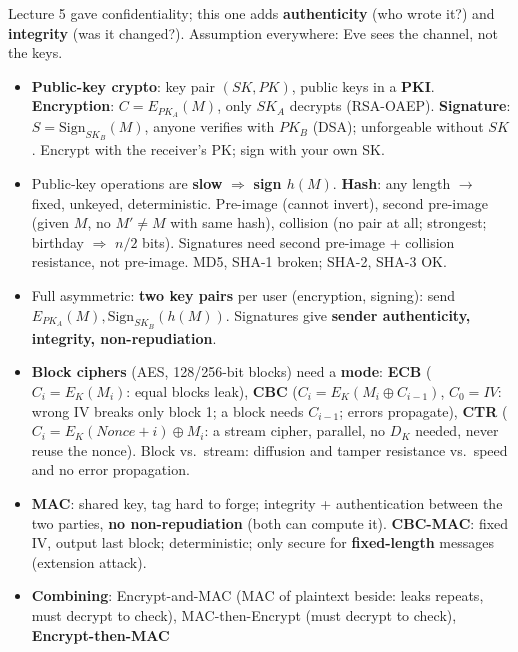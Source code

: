 \begin{recapbox}[title={Exam-ready recap --- Lecture 6: Applied cryptography II}]
Lecture 5 gave confidentiality; this one adds \textbf{authenticity} (who wrote it?) and
\textbf{integrity} (was it changed?). Assumption everywhere: Eve sees the channel, not the keys.
\begin{itemize}
  \item \textbf{Public-key crypto}: key pair $(SK, PK)$, public keys in a \textbf{PKI}.
        \textbf{Encryption}: $C = E_{PK_A}(M)$, only $SK_A$ decrypts (RSA-OAEP).
        \textbf{Signature}: $S = \mathrm{Sign}_{SK_B}(M)$, anyone verifies with $PK_B$ (DSA);
        unforgeable without $SK$. Encrypt with the receiver's PK; sign with your own SK.
  \item Public-key operations are \textbf{slow} $\Rightarrow$ \textbf{sign $h(M)$}.
        \textbf{Hash}: any length $\to$ fixed, unkeyed, deterministic. Pre-image (cannot
        invert), second pre-image (given $M$, no $M' \ne M$ with same hash), collision (no pair
        at all; strongest; birthday $\Rightarrow$ $n/2$ bits). Signatures need second pre-image +
        collision resistance, not pre-image. MD5, SHA-1 broken; SHA-2, SHA-3 OK.
  \item Full asymmetric: \textbf{two key pairs} per user (encryption, signing): send
        $E_{PK_A}(M), \mathrm{Sign}_{SK_B}(h(M))$. Signatures give \textbf{sender authenticity,
        integrity, non-repudiation}.
  \item \textbf{Block ciphers} (AES, 128/256-bit blocks) need a \textbf{mode}: \textbf{ECB}
        ($C_i = E_K(M_i)$: equal blocks leak), \textbf{CBC} ($C_i = E_K(M_i \oplus C_{i-1})$,
        $C_0 = IV$: wrong IV breaks only block 1; a block needs $C_{i-1}$; errors propagate),
        \textbf{CTR} ($C_i = E_K(\mathit{Nonce}+i) \oplus M_i$: a stream cipher, parallel, no
        $D_K$ needed, never reuse the nonce). Block vs.\ stream: diffusion and tamper
        resistance vs.\ speed and no error propagation.
  \item \textbf{MAC}: shared key, tag hard to forge; integrity + authentication between the two
        parties, \textbf{no non-repudiation} (both can compute it). \textbf{CBC-MAC}: fixed IV,
        output last block; deterministic; only secure for \textbf{fixed-length} messages
        (extension attack).
  \item \textbf{Combining}: Encrypt-and-MAC (MAC of plaintext beside: leaks repeats, must
        decrypt to check), MAC-then-Encrypt (must decrypt to check), \textbf{Encrypt-then-MAC}

\end{itemize}
\end{recapbox}
